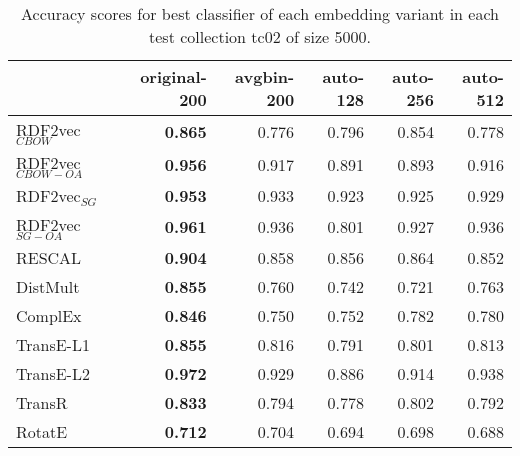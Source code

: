 \documentclass[11pt,titlepage,oneside,openany]{book}
\begin{document}
\begin{table}[h!]
\centering
\begin{tabular}{lrrrrr}
\toprule
{} &  original-200 &  avgbin-200 &  auto-128 &  auto-256 &  auto-512 \\
\midrule
RDF2vec$_{CBOW}$     &	\textbf{0.865} &       0.776  &     0.796  &     0.854  &     0.778  \\
RDF2vec$_{CBOW-OA}$  &	\textbf{0.956} &       0.917  &     0.891  &     0.893  &     0.916  \\
RDF2vec$_{SG}$       &	\textbf{0.953} &       0.933  &     0.923  &     0.925  &     0.929  \\
RDF2vec$_{SG-OA}$    &	\textbf{0.961} &       0.936  &     0.801  &     0.927  &     0.936  \\
RESCAL               &	\textbf{0.904} &       0.858  &     0.856  &     0.864  &     0.852  \\
DistMult             &	\textbf{0.855} &       0.760  &     0.742  &     0.721  &     0.763  \\
ComplEx              &	\textbf{0.846} &       0.750  &     0.752  &     0.782  &     0.780  \\
TransE-L1            &	\textbf{0.855} &       0.816  &     0.791  &     0.801  &     0.813  \\
TransE-L2            &	\textbf{0.972} &       0.929  &     0.886  &     0.914  &     0.938  \\
TransR               &	\textbf{0.833} &       0.794  &     0.778  &     0.802  &     0.792  \\
RotatE               &	\textbf{0.712} &       0.704  &     0.694  &     0.698  &     0.688  \\
\bottomrule
\end{tabular}
\caption{Accuracy scores for best classifier of each embedding variant in each test collection tc02 of size 5000.}
\label{tab:dlcc-acc-tc02-5000}
\end{table}
\end{document}
